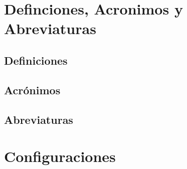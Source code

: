 \documentclass[letter,12pt]{report}
\begin{document}
\renewcommand{\refname}{Referencias}



\renewcommand{\appendixname}{Anexos}
\appendix

\chapter{Definciones, Acronimos y Abreviaturas}\label{definiciones}
\section{Definiciones}
\section{Acrónimos}
\section{Abreviaturas}




\chapter{Configuraciones}\label{configuracion}
\blindtext %
\end{document}
